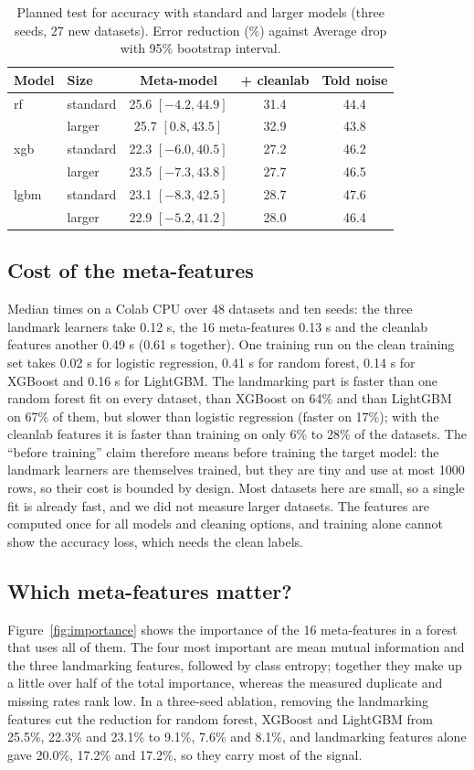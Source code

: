 \documentclass[conference]{IEEEtran}
\begin{document}
\begin{table}[!t]
\centering
\caption{Planned test for accuracy with standard and larger models (three seeds, 27 new datasets). Error reduction (\%) against Average drop with 95\% bootstrap interval.}
\label{tab:big}
\footnotesize
\setlength{\tabcolsep}{3pt}
\begin{tabular}{@{}llccc@{}}
\toprule
Model & Size & Meta-model & + cleanlab & Told noise \\
\midrule
rf & standard & 25.6 $[-4.2, 44.9]$ & 31.4 & 44.4 \\
 & larger & 25.7 $[0.8, 43.5]$ & 32.9 & 43.8 \\
xgb & standard & 22.3 $[-6.0, 40.5]$ & 27.2 & 46.2 \\
 & larger & 23.5 $[-7.3, 43.8]$ & 27.7 & 46.5 \\
lgbm & standard & 23.1 $[-8.3, 42.5]$ & 28.7 & 47.6 \\
 & larger & 22.9 $[-5.2, 41.2]$ & 28.0 & 46.4 \\
\bottomrule
\end{tabular}
\end{table}

\subsection{Cost of the meta-features}
Median times on a Colab CPU over 48 datasets and ten seeds: the three landmark learners take 0.12 s, the 16 meta-features 0.13 s and the cleanlab features another 0.49 s (0.61 s together). One training run on the clean training set takes 0.02 s for logistic regression, 0.41 s for random forest, 0.14 s for XGBoost and 0.16 s for LightGBM. The landmarking part is faster than one random forest fit on every dataset, than XGBoost on 64\% and than LightGBM on 67\% of them, but slower than logistic regression (faster on 17\%); with the cleanlab features it is faster than training on only 6\% to 28\% of the datasets. The ``before training'' claim therefore means before training the target model: the landmark learners are themselves trained, but they are tiny and use at most 1000 rows, so their cost is bounded by design. Most datasets here are small, so a single fit is already fast, and we did not measure larger datasets. The features are computed once for all models and cleaning options, and training alone cannot show the accuracy loss, which needs the clean labels.

\subsection{Which meta-features matter?}
Figure~\ref{fig:importance} shows the importance of the 16 meta-features in a forest that uses all of them. The four most important are mean mutual information and the three landmarking features, followed by class entropy; together they make up a little over half of the total importance, whereas the measured duplicate and missing rates rank low. In a three-seed ablation, removing the landmarking features cut the reduction for random forest, XGBoost and LightGBM from 25.5\%, 22.3\% and 23.1\% to 9.1\%, 7.6\% and 8.1\%, and landmarking features alone gave 20.0\%, 17.2\% and 17.2\%, so they carry most of the signal.
\end{document}
